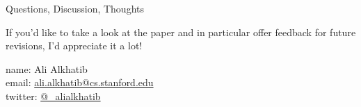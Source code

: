\documentclass[presentation]{subfiles}
\begin{document}
  \begin{frame}{Questions, Discussion, Thoughts}

    If you'd like to take a look at the paper and in particular offer feedback for future revisions, I'd appreciate it a lot!
  
      name: {Ali Alkhatib} \\
      email: \href{mailto:ali.alkhatib@cs.stanford.edu}{ali.alkhatib@cs.stanford.edu} \\
      twitter: \href{https://twitter.com/_alialkhatib}{@\_alialkhatib} \\
  \end{frame}
\end{document}

